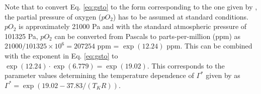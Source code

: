 \documentclass{myreport}
\begin{document}
Note that to convert Eq. \ref{eq:gsto} to the form corresponding to the one given by \citet{bernacchi01}, the partial pressure of oxygen ($pO_2$) has to be assumed at standard conditions. $pO_2$ is approximately 21000 Pa and with the standard atmospheric pressure of 101325 Pa, $pO_2$ can be converted from Pascals to parts-per-million (ppm) as $21000/101325 \times 10^6 = 207254$ ppm = $\exp(12.24)$ ppm. This can be combined with the exponent in Eq. \ref{eq:gsto} to $\exp(12.24) \cdot \exp(6.779) = \exp(19.02)$. This corresponds to the parameter values determining the temperature dependence of $\Gamma^\ast$ given by \citet{bernacchi01} as  $\Gamma^\ast = \exp(19.02-37.83/(T_K R))$.









\end{document}
